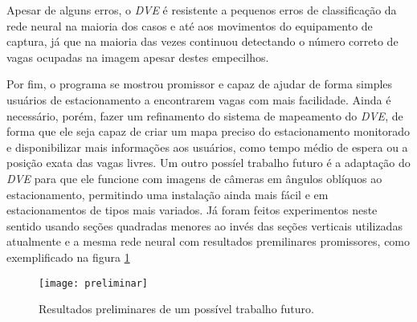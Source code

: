 Apesar de alguns erros, o \textit{DVE} é resistente a pequenos erros de classificação da rede neural na maioria dos casos e até aos movimentos do equipamento de captura, já que na maioria das vezes continuou detectando o número correto de vagas ocupadas na imagem apesar destes empecilhos.

Por fim, o programa se mostrou promissor e capaz de ajudar de forma simples usuários de estacionamento a encontrarem vagas com mais facilidade. Ainda é necessário, porém, fazer um refinamento do sistema de mapeamento do \textit{DVE}, de forma que ele seja capaz de criar um mapa preciso do estacionamento monitorado e disponibilizar mais informações aos usuários, como tempo médio de espera ou a posição exata das vagas livres. Um outro possíel trabalho futuro é a adaptação do \textit{DVE} para que ele funcione com imagens de câmeras em ângulos oblíquos ao estacionamento, permitindo uma instalação ainda mais fácil e em estacionamentos de tipos mais variados. Já foram feitos experimentos neste sentido usando seções quadradas menores ao invés das seções verticais utilizadas atualmente e a mesma rede neural com resultados premilinares promissores, como exemplificado na figura \ref{fig:preliminares}

\begin{figure}%
\centering
\texttt{[image: preliminar]}%
\caption{Resultados preliminares de um possível trabalho futuro.}%
\label{fig:preliminares}%
\centering
\end{figure}









